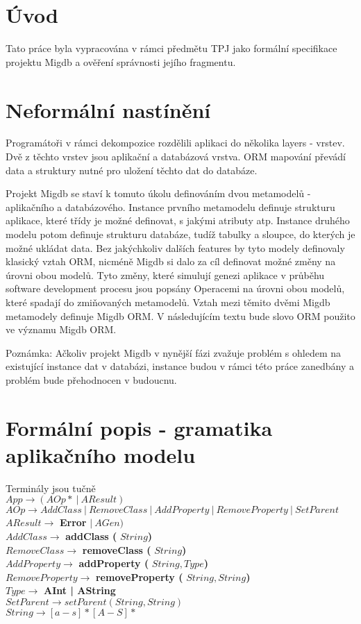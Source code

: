 \documentclass{article}
\begin{document}
\section{Úvod}
Tato práce byla vypracována v rámci předmětu TPJ jako formální specifikace
projektu Migdb a ověření správnosti jejího fragmentu.

\section{Neformální nastínění}
Programátoři v rámci dekompozice rozdělili aplikaci do několika layers - vrstev.
Dvě z těchto vrstev jsou aplikační a databázová vrstva. ORM mapování převádí
data a struktury nutné pro uložení těchto dat do databáze.

Projekt Migdb se staví k tomuto úkolu definováním dvou metamodelů - aplikačního
a databázového. Instance prvního metamodelu definuje
strukturu aplikace, které třídy je možné definovat, s jakými atributy atp. Instance druhého modelu
potom definuje strukturu databáze, tudíž tabulky a sloupce, do kterých je možné
ukládat data. Bez jakýchkoliv dalších features by tyto modely definovaly
klasický vztah ORM, nicméně Migdb si dalo za cíl definovat možné změny na úrovni
obou modelů. Tyto změny, které simulují genezi aplikace v průběhu software
development procesu jsou popsány Operacemi na úrovni obou modelů, které
spadají do zmiňovaných metamodelů. Vztah mezi těmito dvěmi Migdb metamodely
definuje Migdb ORM. V následujícím textu bude slovo ORM použito ve významu Migdb
ORM.

Poznámka: Ačkoliv projekt Migdb v nynější fázi zvažuje problém s ohledem na
existující instance dat v databázi, instance budou v rámci této práce zanedbány
a problém bude přehodnocen v budoucnu.


\section{Formální popis - gramatika aplikačního modelu}
Terminály jsou tučně \\

$App \rightarrow (AOp*\ |\ AResult )$ \\
$AOp \rightarrow AddClass\ |\ RemoveClass\ |\ AddProperty\ |\ RemoveProperty\ |\
SetParent $ \\
$AResult \rightarrow$ \textbf{Error} $|\ AGen )$ \\
$AddClass \rightarrow $ \textbf{addClass (} $String$\textbf{)} \\
$RemoveClass \rightarrow $ \textbf{removeClass (} $String$\textbf{)} \\
$AddProperty \rightarrow $ \textbf{addProperty (} $String, Type $\textbf{)} \\
$RemoveProperty  \rightarrow $ \textbf{removeProperty (} $String,
String$\textbf{)} \\
$Type \rightarrow $ \textbf{AInt | AString} \\
$SetParent \rightarrow setParent(String, String)$ \\
$String \rightarrow [a-s]*[A-S]* $ \\
\end{document}
